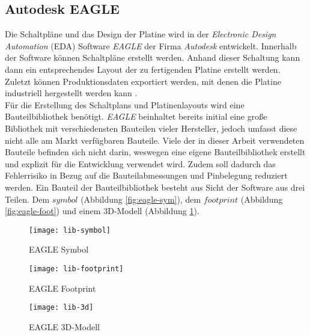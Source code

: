 
\subsection{Autodesk EAGLE}
Die Schaltpläne und das Design der Platine wird in der \textit{Electronic Design Automation} (EDA) Software \textit{EAGLE} der Firma \textit{Autodesk} entwickelt. Innerhalb der Software können Schaltpläne erstellt werden. Anhand dieser Schaltung kann dann ein entsprechendes Layout der zu fertigenden Platine erstellt werden. Zuletzt können Produktionsdaten exportiert werden, mit denen die Platine industriell hergestellt werden kann \cite{eagle_homepage}.\\
Für die Erstellung des Schaltplans und Platinenlayouts wird eine Bauteilbibliothek benötigt. \textit{EAGLE} beinhaltet bereits initial eine große Bibliothek mit verschiedensten Bauteilen vieler Hersteller, jedoch umfasst diese nicht alle am Markt verfügbaren Bauteile. Viele der in dieser Arbeit verwendeten Bauteile befinden sich nicht darin, weswegen eine eigene Bauteilbibliothek erstellt und explizit für die Entwicklung verwendet wird. Zudem soll dadurch das Fehlerrisiko in Bezug auf die Bauteilabmessungen und Pinbelegung reduziert werden. Ein Bauteil der Bauteilbibliothek besteht aus Sicht der Software aus drei Teilen. Dem $symbol$ (Abbildung \ref{fig:eagle-sym}), dem $footprint$ (Abbildung \ref{fig:eagle-foot}) und einem 3D-Modell (Abbildung \ref{fig:eagle-3d}).
\begin{figure}[h]
	\centering
	\begin{minipage}{.3\linewidth}
		\centering
		\texttt{[image: lib-symbol]}
		\caption{EAGLE Symbol}
		\label{fig:eagle-sym}
	\end{minipage}
	\hfill
	\begin{minipage}{.3\linewidth}
		\centering
		\texttt{[image: lib-footprint]}
		\caption{EAGLE Footprint}
		\label{fig:eagle-foot}
	\end{minipage}
	\hfill
	\begin{minipage}{.3\linewidth}
		\centering
		\texttt{[image: lib-3d]}
		\caption{EAGLE 3D-Modell}
		\label{fig:eagle-3d}
	\end{minipage}
\end{figure}
